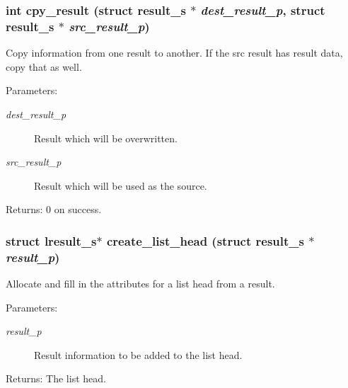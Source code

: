 \subsubsection{\setlength{\rightskip}{0pt plus 5cm}int cpy\_\-result (struct \bf{result\_\-s} $\ast$ {\em dest\_\-result\_\-p}, struct \bf{result\_\-s} $\ast$ {\em src\_\-result\_\-p})}\label{llist_8h_b0d6e6a78fceaae23acdbf75b6ad5344}


Copy information from one result to another. If the src result has result data, copy that as well.

\begin{Desc}
\item[Parameters:]
\begin{description}
\item[{\em dest\_\-result\_\-p}]Result which will be overwritten. \item[{\em src\_\-result\_\-p}]Result which will be used as the source. \end{description}
\end{Desc}
\begin{Desc}
\item[Returns:]0 on success. \end{Desc}
\subsubsection{\setlength{\rightskip}{0pt plus 5cm}struct \bf{lresult\_\-s}$\ast$ create\_\-list\_\-head (struct \bf{result\_\-s} $\ast$ {\em result\_\-p})}\label{llist_8h_ad1ce48b90bbd19f253efaf8ec25a085}


Allocate and fill in the attributes for a list head from a result.

\begin{Desc}
\item[Parameters:]
\begin{description}
\item[{\em result\_\-p}]Result information to be added to the list head. \end{description}
\end{Desc}
\begin{Desc}
\item[Returns:]The list head. \end{Desc}
